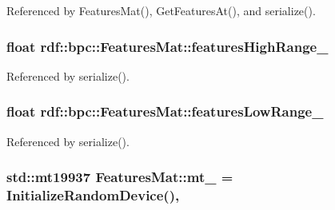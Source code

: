 Referenced by Features\+Mat(), Get\+Features\+At(), and serialize().

\subsubsection[{\texorpdfstring{features\+High\+Range\+\_\+}{featuresHighRange_}}]{\setlength{\rightskip}{0pt plus 5cm}float rdf\+::bpc\+::\+Features\+Mat\+::features\+High\+Range\+\_\+\hspace{0.3cm}{\ttfamily [private]}}\hypertarget{classrdf_1_1bpc_1_1FeaturesMat_a3c6a55c571fac002562a59b67f681719}{}\label{classrdf_1_1bpc_1_1FeaturesMat_a3c6a55c571fac002562a59b67f681719}


Referenced by serialize().

\subsubsection[{\texorpdfstring{features\+Low\+Range\+\_\+}{featuresLowRange_}}]{\setlength{\rightskip}{0pt plus 5cm}float rdf\+::bpc\+::\+Features\+Mat\+::features\+Low\+Range\+\_\+\hspace{0.3cm}{\ttfamily [private]}}\hypertarget{classrdf_1_1bpc_1_1FeaturesMat_a77e4d847ce04f626964fe361d7bee1a5}{}\label{classrdf_1_1bpc_1_1FeaturesMat_a77e4d847ce04f626964fe361d7bee1a5}


Referenced by serialize().

\subsubsection[{\texorpdfstring{mt\+\_\+}{mt_}}]{\setlength{\rightskip}{0pt plus 5cm}std\+::mt19937 Features\+Mat\+::mt\+\_\+ = {\bf Initialize\+Random\+Device}()\hspace{0.3cm}{\ttfamily [static]}, {\ttfamily [private]}}\hypertarget{classrdf_1_1bpc_1_1FeaturesMat_ae4222f4a5e1a75b6bacd6f03108a2095}{}\label{classrdf_1_1bpc_1_1FeaturesMat_ae4222f4a5e1a75b6bacd6f03108a2095}


